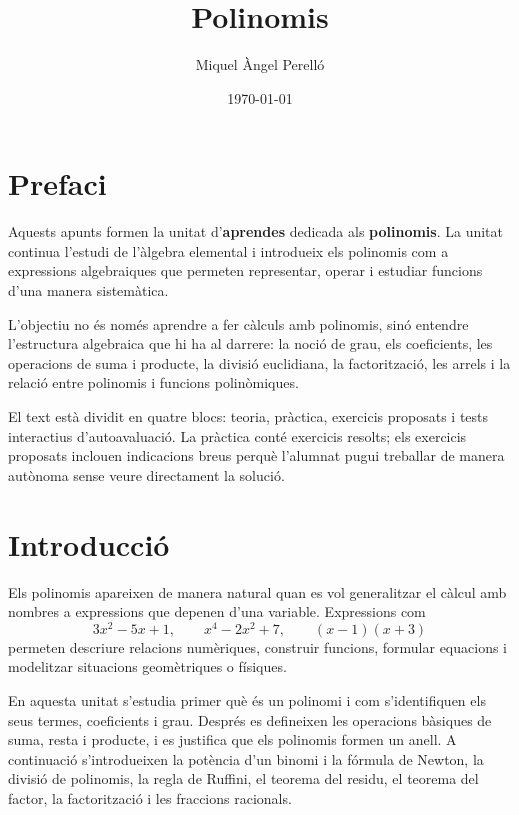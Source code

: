 \documentclass[12pt,a4paper,oneside]{book}
\begin{document}
\pagecolor{fons!20}

\frontmatter

\title{Polinomis}
\author{Miquel Àngel Perelló}
\date{\today}


\maketitle
\tableofcontents

\let\cleardoublepage\clearpage

\chapter*{Prefaci}

Aquests apunts formen la unitat d'\textbf{aprendes} dedicada als \textbf{polinomis}.
La unitat continua l'estudi de l'àlgebra elemental i introdueix els polinomis com a expressions algebraiques que permeten representar, operar i estudiar funcions d'una manera sistemàtica.

L'objectiu no és només aprendre a fer càlculs amb polinomis, sinó entendre l'estructura algebraica que hi ha al darrere: la noció de grau, els coeficients, les operacions de suma i producte, la divisió euclidiana, la factorització, les arrels i la relació entre polinomis i funcions polinòmiques.

El text està dividit en quatre blocs: teoria, pràctica, exercicis proposats i tests interactius d'autoavaluació. La pràctica conté exercicis resolts; els exercicis proposats inclouen indicacions breus perquè l'alumnat pugui treballar de manera autònoma sense veure directament la solució.

\chapter{Introducció}

Els polinomis apareixen de manera natural quan es vol generalitzar el càlcul amb nombres a expressions que depenen d'una variable. Expressions com
\[
3x^2-5x+1, \qquad x^4-2x^2+7, \qquad (x-1)(x+3)
\]
permeten descriure relacions numèriques, construir funcions, formular equacions i modelitzar situacions geomètriques o físiques.

En aquesta unitat s'estudia primer què és un polinomi i com s'identifiquen els seus termes, coeficients i grau. Després es defineixen les operacions bàsiques de suma, resta i producte, i es justifica que els polinomis formen un anell. A continuació s'introdueixen la potència d'un binomi i la fórmula de Newton, la divisió de polinomis, la regla de Ruffini, el teorema del residu, el teorema del factor, la factorització i les fraccions racionals.
\end{document}
